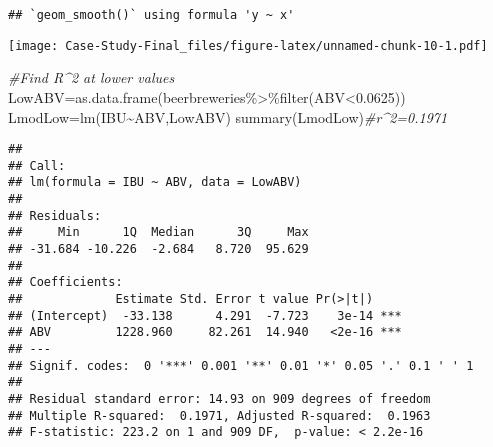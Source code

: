 \documentclass[
]{article}
\newenvironment{Shaded}{\begin{snugshade}}{\end{snugshade}}
\newcommand{\CommentTok}[1]{\textcolor[rgb]{0.56,0.35,0.01}{\textit{#1}}}
\newcommand{\FloatTok}[1]{\textcolor[rgb]{0.00,0.00,0.81}{#1}}
\newcommand{\FunctionTok}[1]{\textcolor[rgb]{0.00,0.00,0.00}{#1}}
\newcommand{\NormalTok}[1]{#1}
\newcommand{\OtherTok}[1]{\textcolor[rgb]{0.56,0.35,0.01}{#1}}
\newcommand{\SpecialCharTok}[1]{\textcolor[rgb]{0.00,0.00,0.00}{#1}}
\begin{document}
\begin{verbatim}
## `geom_smooth()` using formula 'y ~ x'
\end{verbatim}

\texttt{[image: Case-Study-Final\_files/figure-latex/unnamed-chunk-10-1.pdf]}

\begin{Shaded}
\begin{Highlighting}[]
\CommentTok{\#Find R\^{}2 at lower values}
\NormalTok{LowABV}\OtherTok{=}\FunctionTok{as.data.frame}\NormalTok{(beerbreweries}\SpecialCharTok{\%\textgreater{}\%}\FunctionTok{filter}\NormalTok{(ABV}\SpecialCharTok{\textless{}}\FloatTok{0.0625}\NormalTok{))}
\NormalTok{LmodLow}\OtherTok{=}\FunctionTok{lm}\NormalTok{(IBU}\SpecialCharTok{\textasciitilde{}}\NormalTok{ABV,LowABV)}
\FunctionTok{summary}\NormalTok{(LmodLow)}\CommentTok{\#r\^{}2=0.1971}
\end{Highlighting}
\end{Shaded}

\begin{verbatim}
## 
## Call:
## lm(formula = IBU ~ ABV, data = LowABV)
## 
## Residuals:
##     Min      1Q  Median      3Q     Max 
## -31.684 -10.226  -2.684   8.720  95.629 
## 
## Coefficients:
##             Estimate Std. Error t value Pr(>|t|)    
## (Intercept)  -33.138      4.291  -7.723    3e-14 ***
## ABV         1228.960     82.261  14.940   <2e-16 ***
## ---
## Signif. codes:  0 '***' 0.001 '**' 0.01 '*' 0.05 '.' 0.1 ' ' 1
## 
## Residual standard error: 14.93 on 909 degrees of freedom
## Multiple R-squared:  0.1971, Adjusted R-squared:  0.1963 
## F-statistic: 223.2 on 1 and 909 DF,  p-value: < 2.2e-16
\end{verbatim}
\end{document}
